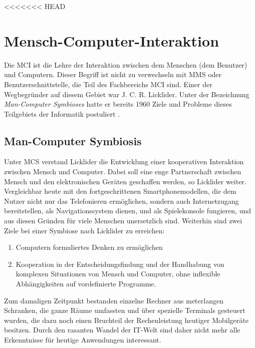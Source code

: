 <<<<<<< HEAD
\chapter{Mensch-Computer-Interaktion}
\label{chap:MenschComputerInteraktion}

Die \gls{MCI} ist die Lehre der Interaktion zwischen dem Menschen (dem Benutzer) und Computern. Dieser Begriff ist nicht zu verwechseln mit \gls{MMS} oder Benutzerschnittstelle, die Teil des Fachbereichs \gls{MCI} sind.
\newline
Einer der Wegbegr\"under auf diesem Gebiet war J. C. R. Licklider. Unter der Bezeichnung \textit{Man-Computer Symbioses} hatte er bereits 1960 Ziele und Probleme dieses Teilgebiets der Informatik postuliert \cite{bib:Lick_Symbiosis}. 

\section{Man-Computer Symbiosis}
Unter \gls{MCS} verstand Licklider die Entwicklung einer kooperativen Interaktion zwischen Mensch und Computer. Dabei soll eine enge Partnerschaft zwischen Mensch und den elektronischen Ger\"aten geschaffen werden, so Licklider weiter. Vergleichbar heute mit den fortgeschrittenen Smartphonemodellen, die dem Nutzer nicht nur das Telefonieren erm\"oglichen, sondern auch Internetzugang bereitstellen, als Navigationssystem dienen, und als Spielekonsole fungieren, und aus diesen Gr\"unden f\"ur viele Menschen unersetzlich sind.
Weiterhin sind zwei Ziele bei einer Symbiose nach Licklider zu erreichen:
\begin{enumerate}
\item Computern formuliertes Denken zu erm\"oglichen
\item Kooperation in der Entscheidungsfindung und der Handhabung von komplexen Situationen von Mensch und Computer, ohne inflexible Abh\"angigkeiten auf vordefinierte Programme.
\end{enumerate}
Zum damaligen Zeitpunkt bestanden einzelne Rechner aus meterlangen Schranken, die ganze R\"aume umfassten und \"uber spezielle Terminals gesteuert wurden, die dazu noch einen Bruchteil der Rechenleistung heutiger Mobilger\"ate besitzen. Durch den rasanten Wandel der IT-Welt sind daher nicht mehr alle Erkenntnisse f\"ur heutige Anwendungen interessant.

